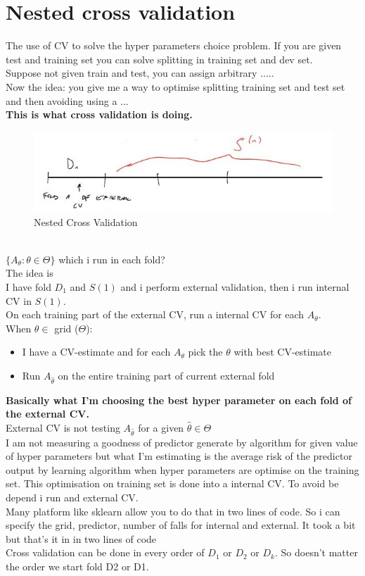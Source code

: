 \documentclass[../main.tex]{subfiles}
\begin{document}
\section{Nested cross validation}
The use of CV to solve the hyper parameters choice problem.
If you are given test and training set you can solve splitting in training set and
dev set.\\
Suppose not given train and test, you can assign arbitrary .....\\
Now the idea: you give me a way to optimise splitting training set and test set
and then avoiding using a ...\\
\textbf{This is what cross validation is doing.}
\begin{figure}[h]
    \centering
    \includegraphics[width=0.8\linewidth]{../img/lez8-img5.JPG}
    \caption{Nested Cross Validation}
\end{figure}\\
$ \{ A_\theta : \theta \in \Theta \}$
which i run in each fold?
\\
The idea is \\
I have fold $D_1$ and $S(1)$ and i perform external validation, then i run internal
CV in $S(1)$.\\
On each training part of the external CV, run a internal CV for each $A_\theta$.
\\When $\theta \in $ grid ($\Theta$):
\begin{itemize}
\item I have a CV-estimate and for each $A_\theta$ pick the $\theta$ with best CV-estimate
\item Run $A_{\hat{\theta}}$ on the entire training part of current external fold
\end{itemize}
\textbf{Basically what I’m choosing the best hyper parameter on each fold of the
external CV.}\\
External CV is not testing $A_{\hat{\theta}}$ for a given $\hat{\theta} \in \Theta$
\\
I am not measuring a goodness of predictor generate by algorithm for given
value of hyper parameters but what I’m estimating is the average risk of the
predictor output by learning algorithm when hyper parameters are optimise on
the training set. This optimisation on training set is done into a internal CV. To
avoid be depend i run and external CV.\\
Many platform like sklearn allow you to do that in two lines of code. So i can
specify the grid, predictor, number of falls for internal and external.
It took a bit but that’s it in in two lines of code\\
Cross validation can be done in every order of $D_1$ or $D_2$ or $D_k$. So doesn’t
matter the order we start fold D2 or D1.
\end{document}
